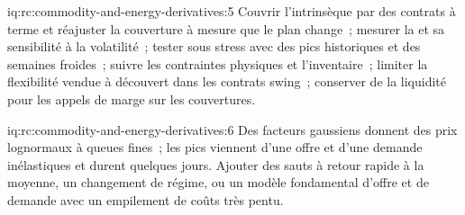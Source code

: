 \begin{solution}{iq:rc:commodity-and-energy-derivatives:5}
Couvrir l'intrinsèque par des contrats à terme et réajuster la couverture à mesure que le plan change~; mesurer
la  et sa sensibilité à la volatilité~; tester sous stress avec des pics historiques et des semaines froides~; suivre
les contraintes physiques et l'inventaire~; limiter la flexibilité vendue à découvert dans les contrats swing~;
conserver de la liquidité pour les appels de marge sur les couvertures.
\end{solution}

\begin{solution}{iq:rc:commodity-and-energy-derivatives:6}
Des facteurs gaussiens donnent des prix lognormaux à queues fines~; les pics viennent d'une offre et d'une demande
inélastiques et durent quelques jours. Ajouter des sauts à retour rapide à la moyenne, un changement de régime, ou un
modèle fondamental d'offre et de demande avec un empilement de coûts très pentu.
\end{solution}

